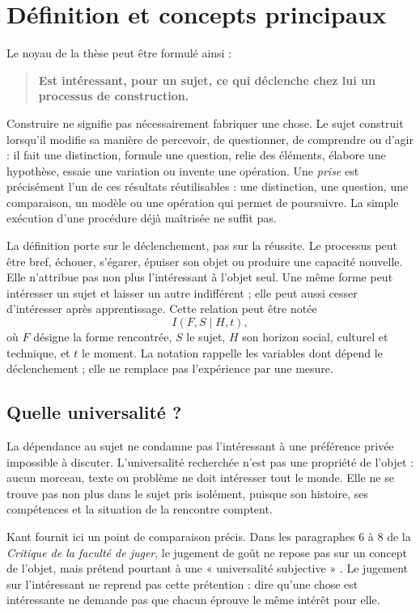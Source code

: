 \documentclass[11pt,a4paper]{article}
\begin{document}
\section{Définition et concepts principaux}

Le noyau de la thèse peut être formulé ainsi :

\begin{quote}
\textbf{Est intéressant, pour un sujet, ce qui déclenche chez lui un processus
de construction.}
\end{quote}

Construire ne signifie pas nécessairement fabriquer une chose. Le sujet
construit lorsqu'il modifie sa manière de percevoir, de questionner, de
comprendre ou d'agir : il fait une distinction, formule une question, relie des
éléments, élabore une hypothèse, essaie une variation ou invente une opération.
Une \emph{prise} est précisément l'un de ces résultats réutilisables : une
distinction, une question, une comparaison, un modèle ou une opération qui
permet de poursuivre. La simple exécution d'une procédure déjà maîtrisée ne
suffit pas.

La définition porte sur le déclenchement, pas sur la réussite. Le processus peut
être bref, échouer, s'égarer, épuiser son objet ou produire une capacité
nouvelle. Elle n'attribue pas non plus l'intéressant à l'objet seul. Une même
forme peut intéresser un sujet et laisser un autre indifférent ; elle peut aussi
cesser d'intéresser après apprentissage. Cette relation peut être notée
\[
  I(F,S\mid H,t),
\]
où \(F\) désigne la forme rencontrée, \(S\) le sujet, \(H\) son horizon social,
culturel et technique, et \(t\) le moment. La notation rappelle les variables
dont dépend le déclenchement ; elle ne remplace pas l'expérience par une mesure.

\subsection{Quelle universalité ?}

La dépendance au sujet ne condamne pas l'intéressant à une préférence privée
impossible à discuter. L'universalité recherchée n'est pas une propriété de
l'objet : aucun morceau, texte ou problème ne doit intéresser tout le monde. Elle
ne se trouve pas non plus dans le sujet pris isolément, puisque son histoire, ses
compétences et la situation de la rencontre comptent.

Kant fournit ici un point de comparaison précis. Dans les paragraphes 6 à 8 de
la \emph{Critique de la faculté de juger}, le jugement de goût ne repose pas sur
un concept de l'objet, mais prétend pourtant à une « universalité subjective »
\parencite[§§ 6--8]{kant1993juger}. Le jugement sur l'intéressant ne reprend pas
cette prétention : dire qu'une chose est intéressante ne demande pas que chacun
éprouve le même intérêt pour elle.
\end{document}
